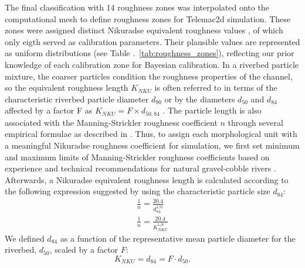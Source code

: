 \documentclass[draft,linenumbers,onecolumn]{agujournal2019} %
\begin{document}
The final classification with 14 roughness zones was interpolated onto the computational mesh to define roughness zones for Telemac2d simulation. These zones were assigned distinct Nikuradse equivalent roughness values , of which only eigth served as calibration parameters. Their plausible values are represented as uniform distributions (see Table .~\ref{tab:roughness_zones}), reflecting our prior knowledge of each calibration zone for Bayesian calibration. In a riverbed particle mixture, the coarser particles condition the roughness properties of the channel, so the equivalent roughness length $K_{NKU}$ is often referred to in terms of the characteristic riverbed particle diameter $d_{90}$ or by the diameters $d_{50}$ and $d_{84}$ affected by a factor F as $K_{NKU} = F \times d_{50,84}$ \cite{tassi2023gaia}. The particle length is also associated with the Manning-Strickler roughness coefficient $n$ through several empirical formulae as described in . Thus, to assign each morphological unit with a meaningful Nikuradse roughness coefficient for simulation, we first set minimum and maximum limits of Manning-Strickler roughness coefficients based on experience and technical recommendations for natural gravel-cobble rivers \cite{chow1959openchannel}. Afterwards, a Nikuradse equivalent roughness length is calculated according to the following expression suggested by \cite{rickenmann2011evaluation} using the characteristic particle size $d_{84}$:
\begin{gather}
	\frac{1}{n} = \frac{20.4}{d_{84}^{1/6}} \label{eq:mann-NIKU eq-orig} \\
	\frac{1}{n} = \frac{20.4}{K_{NKU}^{1/6}} \label{eq:mann-NIKU eq-d84}
\end{gather}
We defined $d_{84}$ as a function of the representative mean particle diameter for the riverbed, $d_{50}$, scaled by a factor $F$: 
\[
K_{NKU} = d_{84} = F \cdot d_{50}.
\]
\end{document}
